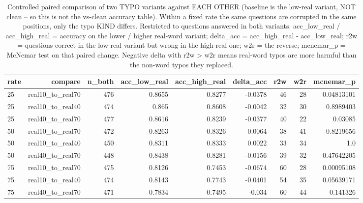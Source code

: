 \documentclass[11pt]{article}
\begin{document}
\begin{table}[H]
\centering
\caption{Controlled paired comparison of two TYPO variants against EACH OTHER (baseline is the low-real variant, NOT clean -- so this is not the vs-clean accuracy table). Within a fixed rate the same questions are corrupted in the same positions, only the typo KIND differs. Restricted to questions answered in both variants. acc\_low\_real / acc\_high\_real = accuracy on the lower / higher real-word variant; delta\_acc = acc\_high\_real - acc\_low\_real; r2w = questions correct in the low-real variant but wrong in the high-real one; w2r = the reverse; mcnemar\_p = McNemar test on that paired change. Negative delta with r2w > w2r means real-word typos are more harmful than the non-word typos they replaced.}
\small
\begin{adjustbox}{max width=\textwidth}
\begin{tabular}{lrrrrrrrr}
\toprule
\textbf{rate} & \textbf{compare} & \textbf{n\_both} & \textbf{acc\_low\_real} & \textbf{acc\_high\_real} & \textbf{delta\_acc} & \textbf{r2w} & \textbf{w2r} & \textbf{mcnemar\_p} \\
\midrule
25 & real10\_to\_real70 & 476 & 0.8655 & 0.8277 & -0.0378 & 46 & 28 & 0.04813101 \\
25 & real10\_to\_real40 & 474 & 0.865 & 0.8608 & -0.0042 & 32 & 30 & 0.8989403 \\
25 & real40\_to\_real70 & 477 & 0.8616 & 0.8239 & -0.0377 & 40 & 22 & 0.03085 \\
50 & real10\_to\_real70 & 472 & 0.8263 & 0.8326 & 0.0064 & 38 & 41 & 0.8219656 \\
50 & real10\_to\_real40 & 450 & 0.8311 & 0.8333 & 0.0022 & 33 & 34 & 1.0 \\
50 & real40\_to\_real70 & 448 & 0.8438 & 0.8281 & -0.0156 & 39 & 32 & 0.47642205 \\
75 & real10\_to\_real70 & 475 & 0.8126 & 0.7453 & -0.0674 & 60 & 28 & 0.00095108 \\
75 & real10\_to\_real40 & 474 & 0.8143 & 0.7743 & -0.0401 & 54 & 35 & 0.05639171 \\
75 & real40\_to\_real70 & 471 & 0.7834 & 0.7495 & -0.034 & 60 & 44 & 0.141326 \\
\bottomrule
\end{tabular}
\end{adjustbox}
\end{table}
\end{document}
